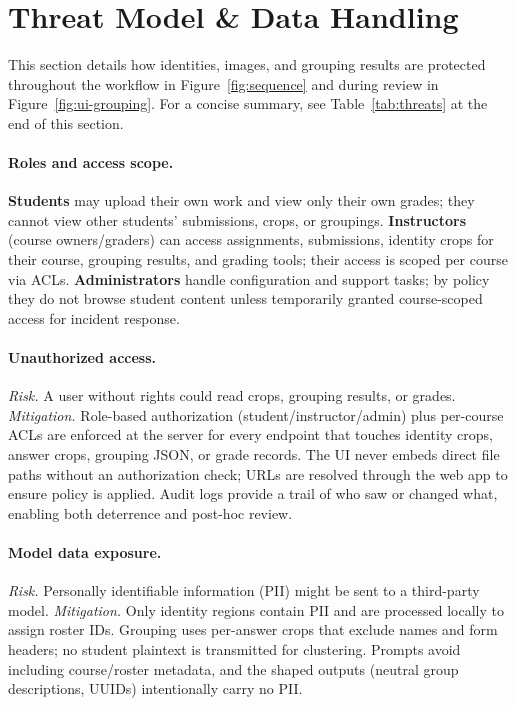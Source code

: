 \documentclass[ms,twoside,print]{nuthesis}
\begin{document}
\section{Threat Model \& Data Handling}
This section details how identities, images, and grouping results are protected throughout the workflow in Figure~\ref{fig:sequence} and during review in Figure~\ref{fig:ui-grouping}. For a concise summary, see Table~\ref{tab:threats} at the end of this section.

\paragraph{Roles and access scope.}
\textbf{Students} may upload their own work and view only their own grades; they cannot view other students’ submissions, crops, or groupings. \textbf{Instructors} (course owners/graders) can access assignments, submissions, identity crops for their course, grouping results, and grading tools; their access is scoped per course via ACLs. \textbf{Administrators} handle configuration and support tasks; by policy they do not browse student content unless temporarily granted course-scoped access for incident response.

\paragraph{Unauthorized access.}
\emph{Risk.} A user without rights could read crops, grouping results, or grades. \emph{Mitigation.} Role-based authorization (student/instructor/admin) plus per-course ACLs are enforced at the server for every endpoint that touches identity crops, answer crops, grouping JSON, or grade records. The UI never embeds direct file paths without an authorization check; URLs are resolved through the web app to ensure policy is applied. Audit logs provide a trail of who saw or changed what, enabling both deterrence and post-hoc review.

\paragraph{Model data exposure.}
\emph{Risk.} Personally identifiable information (PII) might be sent to a third-party model. \emph{Mitigation.} Only identity regions contain PII and are processed locally to assign roster IDs. Grouping uses per-answer crops that exclude names and form headers; no student plaintext is transmitted for clustering. Prompts avoid including course/roster metadata, and the shaped outputs (neutral group descriptions, UUIDs) intentionally carry no PII.
\end{document}
